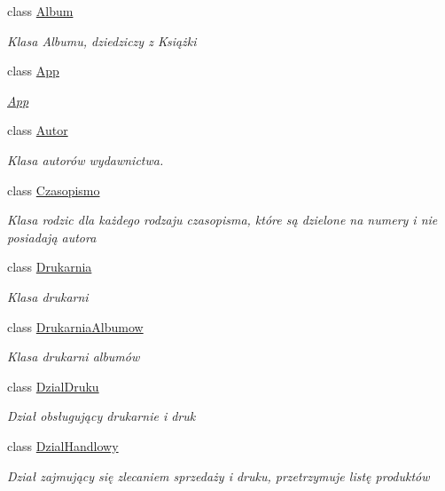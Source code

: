\begin{DoxyCompactItemize}
\item 
class \mbox{\hyperlink{class_projekt1_1_1_album}{Album}}
\begin{DoxyCompactList}\small\item\em Klasa Albumu, dziedziczy z Książki \end{DoxyCompactList}\item 
class \mbox{\hyperlink{class_projekt1_1_1_app}{App}}
\begin{DoxyCompactList}\small\item\em \mbox{\hyperlink{class_projekt1_1_1_app}{App}} \end{DoxyCompactList}\item 
class \mbox{\hyperlink{class_projekt1_1_1_autor}{Autor}}
\begin{DoxyCompactList}\small\item\em Klasa autorów wydawnictwa. \end{DoxyCompactList}\item 
class \mbox{\hyperlink{class_projekt1_1_1_czasopismo}{Czasopismo}}
\begin{DoxyCompactList}\small\item\em Klasa \textquotesingle{}rodzic\textquotesingle{} dla każdego rodzaju czasopisma, które są dzielone na numery i nie posiadają autora \end{DoxyCompactList}\item 
class \mbox{\hyperlink{class_projekt1_1_1_drukarnia}{Drukarnia}}
\begin{DoxyCompactList}\small\item\em Klasa drukarni \end{DoxyCompactList}\item 
class \mbox{\hyperlink{class_projekt1_1_1_drukarnia_albumow}{Drukarnia\+Albumow}}
\begin{DoxyCompactList}\small\item\em Klasa drukarni albumów \end{DoxyCompactList}\item 
class \mbox{\hyperlink{class_projekt1_1_1_dzial_druku}{Dzial\+Druku}}
\begin{DoxyCompactList}\small\item\em Dział obsługujący drukarnie i druk \end{DoxyCompactList}\item 
class \mbox{\hyperlink{class_projekt1_1_1_dzial_handlowy}{Dzial\+Handlowy}}
\begin{DoxyCompactList}\small\item\em Dział zajmujący się zlecaniem sprzedaży i druku, przetrzymuje listę produktów \end{DoxyCompactList}\item 

\end{DoxyCompactItemize}
